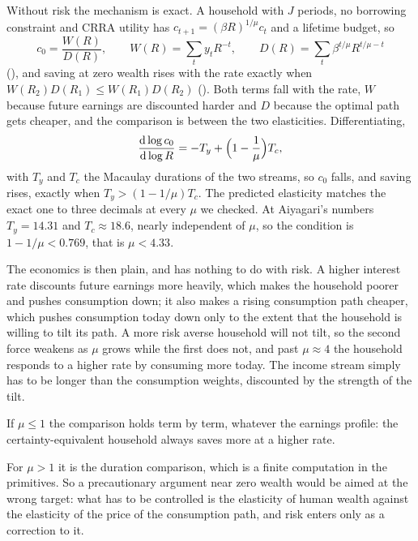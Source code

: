 Without risk the mechanism is exact. A household with $J$ periods, no borrowing constraint and
CRRA utility has $c_{t+1}=(\beta R)^{1/\mu}c_t$ and a lifetime budget, so
\[
  c_0=\frac{W(R)}{D(R)},\qquad
  W(R)=\sum_t y_tR^{-t},\qquad
  D(R)=\sum_t\beta^{t/\mu}R^{t/\mu-t}
\]
(), and saving at zero wealth rises with the rate exactly when
$W(R_2)D(R_1)\le W(R_1)D(R_2)$ (). Both terms fall with the rate,
$W$ because future earnings are discounted harder and $D$ because the optimal path gets cheaper,
and the comparison is between the two elasticities. Differentiating,
\[
  \frac{\mathrm{d}\log c_0}{\mathrm{d}\log R}=-T_y+\Bigl(1-\frac1\mu\Bigr)T_c ,
\]
with $T_y$ and $T_c$ the Macaulay durations of the two streams, so $c_0$ falls, and saving rises,
exactly when $T_y>(1-1/\mu)T_c$. The predicted elasticity matches the exact one to three decimals
at every $\mu$ we checked. At Aiyagari's numbers $T_y=14.31$ and $T_c\approx18.6$, nearly
independent of $\mu$, so the condition is $1-1/\mu<0.769$, that is $\mu<4.33$.

The economics is then plain, and has nothing to do with risk. A higher interest rate discounts
future earnings more heavily, which makes the household poorer and pushes consumption down; it
also makes a rising consumption path cheaper, which pushes consumption today down only to the
extent that the household is willing to tilt its path. A more risk averse household will not
tilt, so the second force weakens as $\mu$ grows while the first does not, and past $\mu\approx4$
the household responds to a higher rate by consuming more today. The income stream simply has to
be longer than the consumption weights, discounted by the strength of the tilt.

\begin{theorem}\label{thm:ce}
If $\mu\le1$ the comparison holds term by term, whatever the earnings profile: the
certainty-equivalent household always saves more at a higher rate.
\end{theorem}

For $\mu>1$ it is the duration comparison, which is a finite computation in the primitives. So a
precautionary argument near zero wealth would be aimed at the wrong target: what has to be
controlled is the elasticity of human wealth against the elasticity of the price of the
consumption path, and risk enters only as a correction to it.

